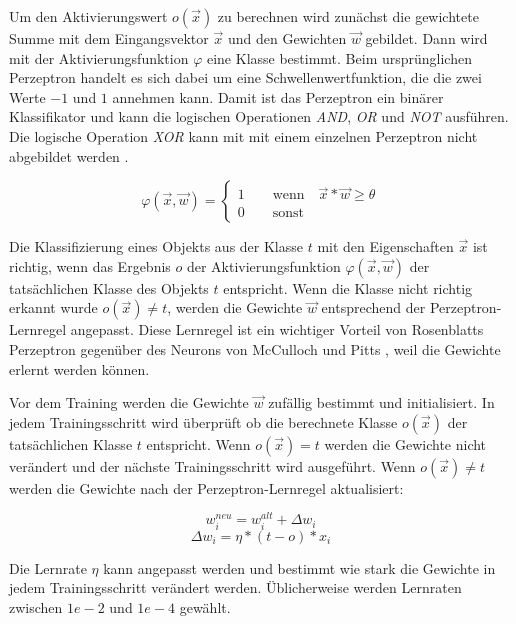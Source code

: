 Um den Aktivierungswert $o(\vec{x})$ zu berechnen wird zunächst die gewichtete Summe mit dem Eingangsvektor $\vec{x}$ und den Gewichten $\vec{w}$ gebildet. Dann wird mit der Aktivierungsfunktion $\varphi$ eine Klasse bestimmt. Beim ursprünglichen Perzeptron handelt es sich dabei um eine Schwellenwertfunktion, die die zwei Werte $-1$ und $1$ annehmen kann. Damit ist das Perzeptron ein binärer Klassifikator und kann die logischen Operationen \textit{AND}, \textit{OR} und \textit{NOT} ausführen. Die logische Operation \textit{XOR} kann mit mit einem einzelnen Perzeptron nicht abgebildet werden \cite{minski1969perceptrons}.

\begin{equation}
\varphi(\vec{x}, \vec{w}) = \begin{cases} 1 \qquad \text{wenn} \quad \vec{x}*\vec{w} \geq \theta \\ 0 \qquad \text{sonst} \end{cases}
\end{equation}

Die Klassifizierung eines Objekts aus der Klasse $t$ mit den Eigenschaften $\vec{x}$ ist richtig, wenn das Ergebnis $o$ der Aktivierungsfunktion $\varphi(\vec{x},\vec{w})$ der tatsächlichen Klasse des Objekts $t$ entspricht. Wenn die Klasse nicht richtig erkannt wurde $o(\vec{x}) \neq t$, werden die Gewichte $\vec{w}$ entsprechend der Perzeptron-Lernregel angepasst. Diese Lernregel ist ein wichtiger Vorteil von Rosenblatts Perzeptron \cite{rosenblatt1958perceptron} gegenüber des Neurons von McCulloch und Pitts \cite{mcculloch1943logical}, weil die Gewichte erlernt werden können.

Vor dem Training werden die Gewichte $\vec{w}$ zufällig bestimmt und initialisiert. In jedem Trainingsschritt wird überprüft ob die berechnete Klasse $o(\vec{x})$ der tatsächlichen Klasse $t$ entspricht. Wenn $o(\vec{x}) = t$ werden die Gewichte nicht verändert und der nächste Trainingsschritt wird ausgeführt. Wenn $o(\vec{x}) \neq t$ werden die Gewichte nach der Perzeptron-Lernregel aktualisiert:

\begin{equation}
w^{neu}_i = w^{alt}_i + \Delta w_i
\end{equation}
\begin{equation}
\Delta w_i = \eta*(t-o)*x_i
\end{equation}

Die Lernrate $\eta$ kann angepasst werden und bestimmt wie stark die Gewichte in jedem Trainingsschritt verändert werden. Üblicherweise werden Lernraten zwischen $1e-2$ und $1e-4$ gewählt.

